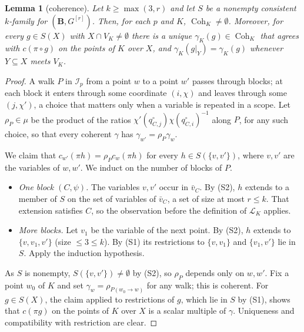 \documentclass[11pt]{article}
\newtheorem{lemma}[theorem]{Lemma}
\theoremstyle{definition}
\theoremstyle{remark}
\newcommand{\Cohset}{\operatorname{Coh}}
\newcommand{\cL}{\mathcal L}
\begin{document}
\begin{lemma}[coherence]\label{lem:coherence}
Let $k\ge\max(3,r)$ and let $S$ be a nonempty consistent $k$-family for
$(\mathbf B,G^{[r]})$. Then, for each $p$ and $K$, $\Cohset_K\ne\emptyset$.
Moreover, for every $g\in S(X)$ with $X\cap V_K\ne\emptyset$ there is a unique
$\gamma_K(g)\in\Cohset_K$ that agrees with $c(\pi\circ g)$ on the points of $K$
over $X$, and $\gamma_K(g|_Y)=\gamma_K(g)$ whenever $Y\subseteq X$ meets $V_K$.
\end{lemma}
\begin{proof}
A walk $P$ in $\mathcal I_p$ from a point $w$ to a point $w'$ passes through
blocks; at each block it enters through some coordinate $(i,\chi)$ and leaves
through some $(j,\chi')$, a choice that matters only when a variable is repeated
in a scope. Let $\rho_P\in\mu$ be the product of the ratios
$\chi'(q^\circ_{C,j})\chi(q^\circ_{C,i})^{-1}$ along $P$, for any such choice,
so that every coherent $\gamma$ has $\gamma_{w'}=\rho_P\gamma_w$.

We claim that $c_{w'}(\pi h)=\rho_Pc_w(\pi h)$ for every $h\in S(\{v,v'\})$,
where $v,v'$ are the variables of $w,w'$. We induct on the number of blocks of
$P$.
\begin{itemize}
\item \emph{One block $(C,\psi)$.} The variables $v,v'$ occur in $\bar v_C$. By
(S2), $h$ extends to a member of $S$ on the set of variables of $\bar v_C$, a set
of size at most $r\le k$. That extension satisfies $C$, so the observation before
the definition of $\cL_K$ applies.
\item \emph{More blocks.} Let $v_1$ be the variable of the next point. By (S2),
$h$ extends to $\{v,v_1,v'\}$ (size $\le3\le k$). By (S1) its restrictions to
$\{v,v_1\}$ and $\{v_1,v'\}$ lie in $S$. Apply the induction hypothesis.
\end{itemize}

As $S$ is nonempty, $S(\{v,v'\})\ne\emptyset$ by (S2), so $\rho_P$ depends only
on $w,w'$. Fix a point $w_0$ of $K$ and set $\gamma_w=\rho_{P(w_0\to w)}$ for any
walk; this is coherent. For $g\in S(X)$, the claim applied to restrictions of
$g$, which lie in $S$ by (S1), shows that $c(\pi g)$ on the points of $K$ over
$X$ is a scalar multiple of $\gamma$. Uniqueness and compatibility with
restriction are clear.
\end{proof}
\end{document}
